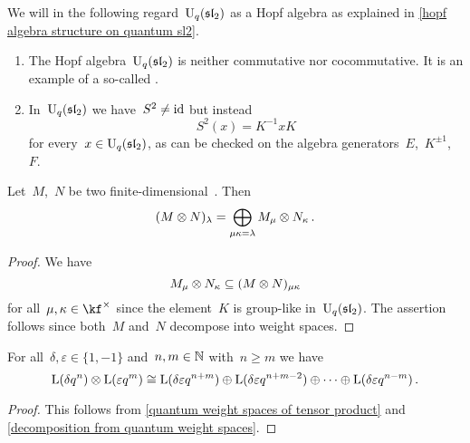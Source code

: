 \documentclass[a4paper, 11pt, oneside]{scrartcl}
\begin{document}
\begin{convention}
  We will in the following regard~$\operatorname{U}_q(\mathfrak{sl}_2)$ as a Hopf algebra as explained in \cref{hopf algebra structure on quantum sl2}.
\end{convention}

\begin{remark}
  \leavevmode
  \begin{enumerate}
    \item
      The Hopf algebra~$\operatorname{U}_q(\mathfrak{sl}_2)$ is neither commutative nor cocommutative.
      It is an example of a so-called .
    \item
      In~$\operatorname{U}_q(\mathfrak{sl}_2)$ we have~$S^2 \neq \mathrm{id}$ but instead
      \[
        S^2(x) = K^{-1} x K
      \]
      for every~$x \in \operatorname{U}_q(\mathfrak{sl}_2)$, as can be checked on the algebra generators~$E$,~$K^{\pm 1}$,~$F$.
  \end{enumerate}
\end{remark}

\begin{lemma}
  \label{quantum weight spaces of tensor product}
  Let~$M$,~$N$ be two finite-dimensional~.
  Then
  \[
    (M \otimes N)_\lambda
    =
    \bigoplus_{\mu \kappa = \lambda}
    M_\mu \otimes N_\kappa \,.
  \]
\end{lemma}

\begin{proof}
  We have
  \[
    M_\mu \otimes N_\kappa
    \subseteq
    (M \otimes N)_{\mu \kappa}
  \]
  for all~$\mu, \kappa \in \kf^\times$ since the element~$K$ is group-like in~$\operatorname{U}_q(\mathfrak{sl}_2)$.
  The assertion follows since both~$M$ and~$N$ decompose into weight spaces.
\end{proof}

\begin{proposition}
  \label{quantum clebsch gordan}
  For all~$\delta, \varepsilon \in \{1, -1\}$ and~$n, m \in \mathbb{N}$ with~$n \geq m$ we have
  \[
    \operatorname{L}(\delta q^n) \otimes \operatorname{L}(\varepsilon q^m)
    \cong
    \operatorname{L}(\delta \varepsilon q^{n+m})
    \oplus
    \operatorname{L}(\delta \varepsilon q^{n+m-2})
    \oplus
    \dotsb
    \oplus
    \operatorname{L}(\delta \varepsilon q^{n-m}) \,.
  \]
\end{proposition}

\begin{proof}
  This follows from \cref{quantum weight spaces of tensor product} and \cref{decomposition from quantum weight spaces}.
\end{proof}
\end{document}

